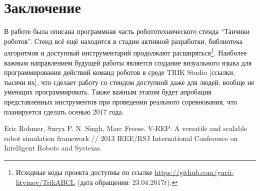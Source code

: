 \documentclass{spisok-article}
\begin{document}
\section{Заключение}

В работе была описана программная часть робототехнического стенда ``Танчики роботов''. Стенд всё ещё находится в стадии активной разработки, библиотека алгоритмов и доступный инструментарий продолжают расширяться\footnote{Исходные коды проекта доступны по ссылке \url{https://github.com/yurii-litvinov/TrikABCL} (дата обращения: 23.04.2017г).}. Наиболее важным направлением будущей работы является создание визуального языка для программирования действий команд роботов в среде TRIK Studio [ссылки, тысячи их], что сделает работу со стендом доступной даже для людей, вообще не умеющих программировать. Также важным этапом будет апробация представленных инструментов при проведении реального соревнования, что планируется сделать осенью 2017 года.

\renewcommand\refname{Литература}
\begin{thebibliography}{8}

 Eric Rohmer, Surya P. N. Singh, Marc Freese. V-REP: A versatile and scalable robot simulation framework // 2013 IEEE/RSJ International Conference on Intelligent Robots and Systems.

\end{thebibliography}
\end{document}
